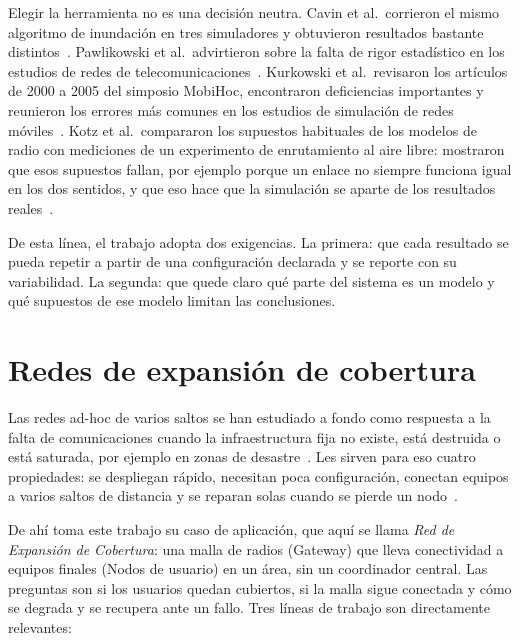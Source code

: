 Elegir la herramienta no es una decisión neutra. Cavin et al.\ corrieron el mismo
algoritmo de inundación en tres simuladores y obtuvieron resultados bastante
distintos~\cite{Cavin2002Accuracy}. Pawlikowski et al.\ advirtieron sobre la falta
de rigor estadístico en los estudios de redes de
telecomunicaciones~\cite{Pawlikowski2002Credibility}. Kurkowski et al.\ revisaron
los artículos de 2000 a 2005 del simposio MobiHoc, encontraron deficiencias
importantes y reunieron los errores más comunes en los estudios de simulación de
redes móviles~\cite{Kurkowski2005Incredibles}. Kotz et al.\ compararon los
supuestos habituales de los modelos de radio con mediciones de un experimento de
enrutamiento al aire libre: mostraron que esos supuestos fallan, por ejemplo porque
un enlace no siempre funciona igual en los dos sentidos, y que eso hace que la
simulación se aparte de los resultados reales~\cite{Kotz2004Assumptions}.

De esta línea, el trabajo adopta dos exigencias. La primera: que cada resultado se
pueda repetir a partir de una configuración declarada y se reporte con su
variabilidad. La segunda: que quede claro qué parte del sistema es un modelo y qué
supuestos de ese modelo limitan las conclusiones.

\section{Redes de expansión de cobertura}
\label{sec:redes-desastre}

Las redes ad-hoc de varios saltos se han estudiado a fondo como respuesta a la
falta de comunicaciones cuando la infraestructura fija no existe, está destruida o
está saturada, por ejemplo en zonas de desastre~\cite{Reina2015Disaster}. Les
sirven para eso cuatro propiedades: se despliegan rápido, necesitan poca
configuración, conectan equipos a varios saltos de distancia y se reparan solas
cuando se pierde un nodo~\cite{Akyildiz2005Mesh,Reina2015Disaster}.

De ahí toma este trabajo su caso de aplicación, que aquí se llama \textit{Red de
Expansión de Cobertura}: una malla de radios (Gateway) que lleva conectividad a
equipos finales (Nodos de usuario) en un área, sin un coordinador central. Las
preguntas son si los usuarios quedan cubiertos, si la malla sigue conectada y cómo
se degrada y se recupera ante un fallo. Tres líneas de trabajo son directamente
relevantes:

